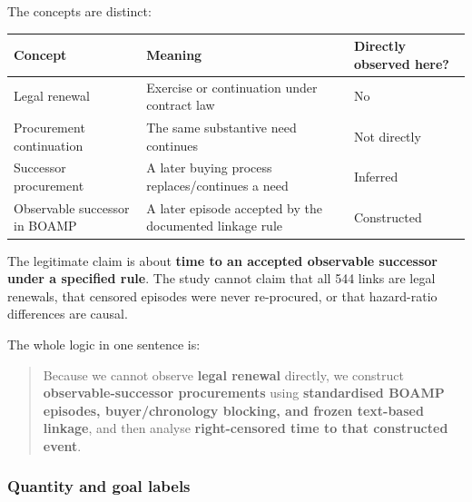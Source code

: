 The concepts are distinct:

{\def\LTcaptype{none} %
\begin{longtable}[]{@{}
  >{\raggedright\arraybackslash}p{}
  >{\raggedright\arraybackslash}p{}
  >{\raggedright\arraybackslash}p{}@{}}
\toprule\noalign{}
\begin{minipage}[b]{\linewidth}\raggedright
Concept
\end{minipage} & \begin{minipage}[b]{\linewidth}\raggedright
Meaning
\end{minipage} & \begin{minipage}[b]{\linewidth}\raggedright
Directly observed here?
\end{minipage} \\
\midrule\noalign{}
\endhead
\bottomrule\noalign{}
\endlastfoot
Legal renewal & Exercise or continuation under contract law & No \\
Procurement continuation & The same substantive need continues & Not
directly \\
Successor procurement & A later buying process replaces/continues a need
& Inferred \\
Observable successor in BOAMP & A later episode accepted by the
documented linkage rule & Constructed \\
\end{longtable}
}

The legitimate claim is about \textbf{time to an accepted observable
successor under a specified rule}. The study cannot claim that all 544
links are legal renewals, that censored episodes were never re-procured,
or that hazard-ratio differences are causal.

The whole logic in one sentence is:

\begin{quote}
Because we cannot observe \textbf{legal renewal} directly, we construct
\textbf{observable-successor procurements} using \textbf{standardised
BOAMP episodes, buyer/chronology blocking, and frozen text-based
linkage}, and then analyse \textbf{right-censored time to that
constructed event}.
\end{quote}

\subsubsection{Quantity and goal labels}\label{quantity-and-goal-labels}

